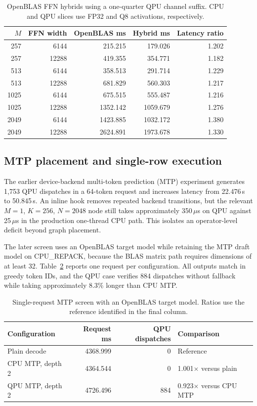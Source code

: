 \documentclass[sigplan,screen,review]{acmart}
\begin{document}
\begin{table}[t]
\centering
\caption{OpenBLAS FFN hybrids using a one-quarter QPU channel suffix. CPU and QPU slices use FP32 and Q8 activations, respectively.}
\label{tab:openblas-hybrid}
\small
\begin{tabular}{@{}rrrrr@{}}
\toprule
$M$ & FFN width & OpenBLAS ms & Hybrid ms & Latency ratio \\
\midrule
257 & 6144 & 215.215 & 179.026 & 1.202 \\
257 & 12288 & 419.355 & 354.771 & 1.182 \\
513 & 6144 & 358.513 & 291.714 & 1.229 \\
513 & 12288 & 681.829 & 560.303 & 1.217 \\
1025 & 6144 & 675.515 & 555.487 & 1.216 \\
1025 & 12288 & 1352.142 & 1059.679 & 1.276 \\
2049 & 6144 & 1423.885 & 1032.172 & 1.380 \\
2049 & 12288 & 2624.891 & 1973.678 & 1.330 \\
\bottomrule
\end{tabular}
\end{table}

\subsection{MTP placement and single-row execution}

The earlier device-backend multi-token prediction (MTP) experiment generates 1,753 QPU dispatches in a 64-token request and increases latency from 22.476\,s to 50.845\,s. An inline hook removes repeated backend transitions, but the relevant \(M=1\), \(K=256\), \(N=2048\) node still takes approximately 350\,$\mu$s on QPU against 25\,$\mu$s in the production one-thread CPU path. This isolates an operator-level deficit beyond graph placement.

The later screen uses an OpenBLAS target model while retaining the MTP draft model on CPU\_REPACK, because the BLAS matrix path requires dimensions of at least 32. Table~\ref{tab:mtp-openblas} reports one request per configuration. All outputs match in greedy token IDs, and the QPU case verifies 884 dispatches without fallback while taking approximately 8.3\% longer than CPU MTP.

\begin{table}[t]
\centering
\caption{Single-request MTP screen with an OpenBLAS target model. Ratios use the reference identified in the final column.}
\label{tab:mtp-openblas}
\small
\begin{tabular}{@{}lrrl@{}}
\toprule
Configuration & Request ms & QPU dispatches & Comparison \\
\midrule
Plain decode & 4368.999 & 0 & Reference \\
CPU MTP, depth 2 & 4364.544 & 0 & 1.001$\times$ versus plain \\
QPU MTP, depth 2 & 4726.496 & 884 & 0.923$\times$ versus CPU MTP \\
\bottomrule
\end{tabular}
\end{table}
\end{document}

